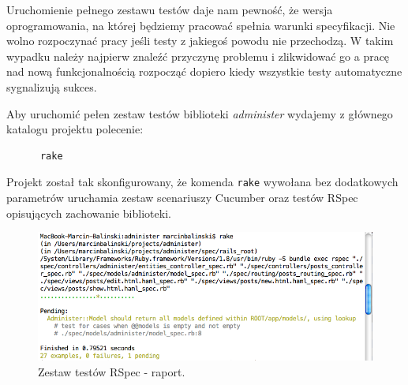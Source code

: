     Uruchomienie pełnego zestawu testów daje nam pewność, że wersja oprogramowania, na której będziemy pracować spełnia warunki specyfikacji. Nie wolno rozpoczynać pracy jeśli testy z jakiegoś powodu nie przechodzą. W takim wypadku należy najpierw znaleźć przyczynę problemu i zlikwidować go a pracę nad nową funkcjonalnością rozpocząć dopiero kiedy wszystkie testy automatyczne sygnalizują sukces.
    
    Aby uruchomić pełen zestaw testów biblioteki \emph{administer} wydajemy z głównego katalogu projektu polecenie:
    
    \begin{lstlisting}
      rake
    \end{lstlisting}
    
    Projekt został tak skonfigurowany, że komenda \texttt{rake} wywołana bez dodatkowych parametrów uruchamia zestaw scenariuszy Cucumber oraz testów RSpec opisujących zachowanie biblioteki. 
    
    
    
    \begin{figure}[!h]
  		\begin{center}
  			\includegraphics[width=\linewidth]{images/spec_report.png}
  			\caption{Zestaw testów RSpec - raport.}
  			\label{spec_report}
  		\end{center}
  	\end{figure}
  	
  	\clearpage
  	
